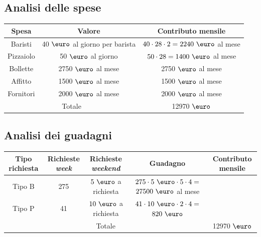\documentclass[a4paper, 12pt]{article}
\begin{document}
\subsection{Analisi delle spese}
\begin{table}[H]
\centering
\begin{tabular}{|c|c|c|}
\hline
\cellcolor{cellcolor}Spesa & \cellcolor{cellcolor}Valore & \cellcolor{cellcolor}Contributo mensile \\
\hline
\hline
Baristi & 40 $\mbox{\euro}$ al giorno per barista & $40 \cdot 28 \cdot 2 = 2240\ \mbox{\euro}$ al mese \\
\hline
Pizzaiolo & 50 $\mbox{\euro}$ al giorno & $50 \cdot 28 = 1400\ \mbox{\euro}$  al mese\\
\hline
Bollette & 2750 $\mbox{\euro}$ al mese & 2750 $\mbox{\euro}$ al mese \\
\hline
Affitto & 1500 $\mbox{\euro}$ al mese & 1500 $\mbox{\euro}$ al mese\\
\hline
Fornitori & 2000 $\mbox{\euro}$ al mese & 2000 $\mbox{\euro}$ al mese\\
\hline
\hline
\multicolumn{2}{|c|}{Totale} & \cellcolor{red!40} 12970 $\mbox{\euro}$\\
\hline

\end{tabular}
\end{table}

\subsection{Analisi dei guadagni}
\begin{adjustbox}{width=\textwidth}
\begin{tabular}{|c|c|c|c|c|}
\hline
\cellcolor{cellcolor}Tipo richiesta & \cellcolor{cellcolor}Richieste \textit{week} & \cellcolor{cellcolor}Richieste \textit{weekend} & \cellcolor{cellcolor}Guadagno & \cellcolor{cellcolor}Contributo mensile \\
\hline
\noalign{\vspace{0.5ex}}
\hline
Tipo B & 275 & $5\ \mbox{\euro}$ a richiesta & \makecell{$275 \cdot 5\ \mbox{\euro} \cdot 5 \cdot 4 =$ \\ $27500\ \mbox{\euro}$ al mese }\\
\hline
Tipo P & 41 & $10\ \mbox{\euro}$ a richiesta & \makecell{$41 \cdot 10\ \mbox{\euro} \cdot 2 \cdot 4 =$ \\ $820\ \mbox{\euro}$} \\

\hline
\hline

\multicolumn{4}{|c|}{Totale} & \cellcolor{green!40} 12970 $\mbox{\euro}$\\
\hline

\end{tabular}
\end{adjustbox}
\end{document}
